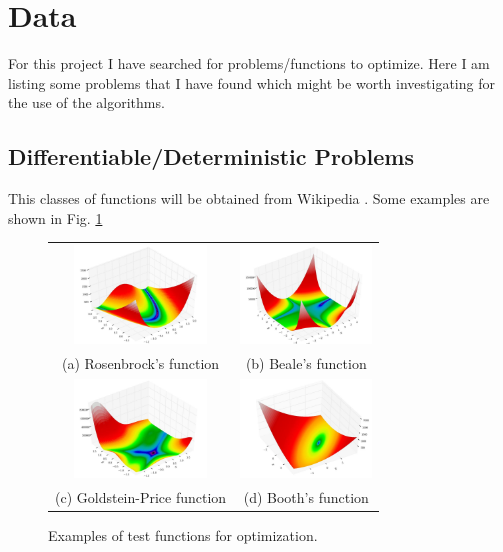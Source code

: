 \documentclass[conference]{IEEEtran}
\begin{document}
\section{Data}
For this project I have searched for problems/functions to optimize. Here I am listing some problems that I have found which might be worth investigating for the use of the algorithms.

\subsection{Differentiable/Deterministic Problems}
This classes of functions will be obtained from Wikipedia \cite{b3}. Some examples are shown in Fig. \ref{testfunfig}

\begin{figure}[tbp]
\begin{tabular}{cc}
  \includegraphics[width=35mm]{Rosenbrock} &   \includegraphics[width=35mm]{Beale} \\
(a) Rosenbrock's function & (b) Beale's function \\[6pt]
 \includegraphics[width=35mm]{Goldstein_Price} &   \includegraphics[width=35mm]{Booth} \\
(c) Goldstein-Price function & (d) Booth's function \\[6pt]
\end{tabular}
\caption{Examples of test functions for optimization.}
\label{testfunfig}
\end{figure}
\end{document}
